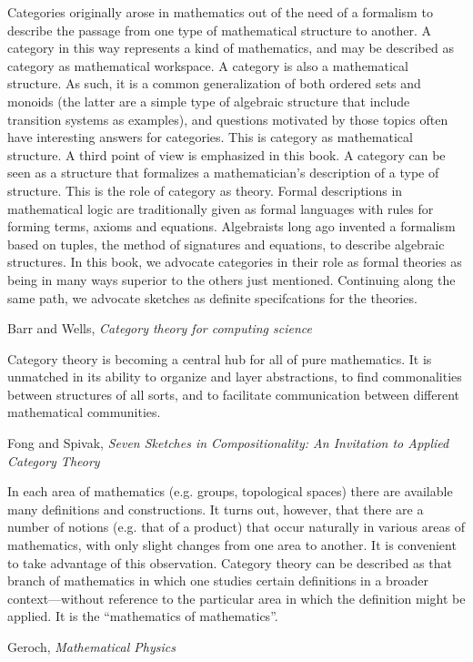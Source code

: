 \documentclass[11pt,openany]{article}
\begin{document}
\epigraph{Categories originally arose in mathematics out of the need of a formalism to
describe the passage from one type of mathematical structure to another. A
category in this way represents a kind of mathematics, and may be described
as category as mathematical workspace.
A category is also a mathematical structure. As such, it is a common
generalization of both ordered sets and monoids (the latter are a simple
type of algebraic structure that include transition systems as examples),
and questions motivated by those topics often have interesting answers for
categories. This is category as mathematical structure.
A third point of view is emphasized in this book. A category can be seen
as a structure that formalizes a mathematician's description of a type of
structure. This is the role of category as theory. Formal descriptions in
mathematical logic are traditionally given as formal languages with rules for
forming terms, axioms and equations. Algebraists long ago invented a formalism
based on tuples, the method of signatures and equations, to describe
algebraic structures. In this book, we advocate categories in their role as formal
theories as being in many ways superior to the others just mentioned.
Continuing along the same path, we advocate sketches as definite specifcations
for the theories.}
{Barr and Wells, \textit{Category theory for computing science}~\cite{barr-wells-2020}}

\epigraph{Category theory is becoming a central hub for all of pure mathematics. It is unmatched
in its ability to organize and layer abstractions, to find commonalities between structures
of all sorts, and to facilitate communication between different mathematical
communities.}
{Fong and Spivak, \textit{Seven Sketches in Compositionality: 
An Invitation to Applied Category Theory}~\cite{fong-spivakd-2018-seven-sketches}}

\pagebreak
\epigraph{In each area of mathematics 
(e.g. groups, topological spaces) 
there are available many definitions and constructions.
It turns out, however, that there are a number of notions
(e.g. that of a product) that occur naturally 
in various areas of mathematics, with only slight changes from
one area to another.
It is convenient to take advantage of this observation.
Category theory can be described as that branch of mathematics
in which one studies certain definitions in a broader context---without
reference to the particular area 
in which the definition might be applied.
It is the ``mathematics of mathematics''.}
{Geroch, \textit{Mathematical Physics}~\cite{geroch-1985}}
\end{document}
